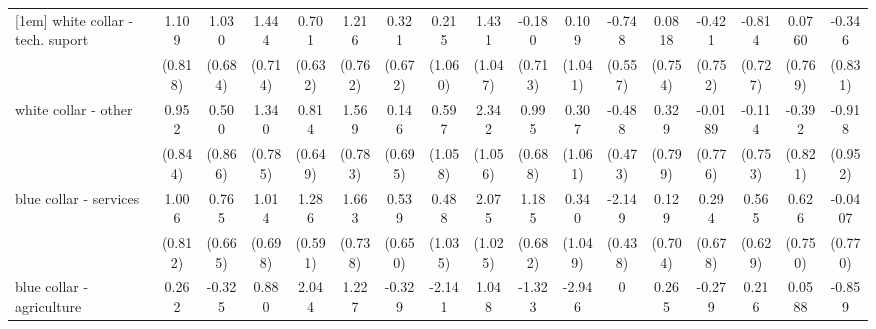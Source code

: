 {\begin{tabular}{l*{16}{c}}
[1em]
white collar - tech. suport&       1.109         &       1.030         &       1.444\sym{*}  &       0.701         &       1.216         &       0.321         &       0.215         &       1.431         &      -0.180         &       0.109         &      -0.748         &      0.0818         &      -0.421         &      -0.814         &      0.0760         &      -0.346         \\
                    &     (0.818)         &     (0.684)         &     (0.714)         &     (0.632)         &     (0.762)         &     (0.672)         &     (1.060)         &     (1.047)         &     (0.713)         &     (1.041)         &     (0.557)         &     (0.754)         &     (0.752)         &     (0.727)         &     (0.769)         &     (0.831)         \\
[1em]
white collar - other&       0.952         &       0.500         &       1.340         &       0.814         &       1.569\sym{*}  &       0.146         &       0.597         &       2.342\sym{*}  &       0.995         &       0.307         &      -0.488         &       0.329         &     -0.0189         &      -0.114         &      -0.392         &      -0.918         \\
                    &     (0.844)         &     (0.866)         &     (0.785)         &     (0.649)         &     (0.783)         &     (0.695)         &     (1.058)         &     (1.056)         &     (0.688)         &     (1.061)         &     (0.473)         &     (0.799)         &     (0.776)         &     (0.753)         &     (0.821)         &     (0.952)         \\
[1em]
blue collar - services&       1.006         &       0.765         &       1.014         &       1.286\sym{*}  &       1.663\sym{*}  &       0.539         &       0.488         &       2.075\sym{*}  &       1.185         &       0.340         &      -2.149\sym{***}&       0.129         &       0.294         &       0.565         &       0.626         &     -0.0407         \\
                    &     (0.812)         &     (0.665)         &     (0.698)         &     (0.591)         &     (0.738)         &     (0.650)         &     (1.035)         &     (1.025)         &     (0.682)         &     (1.049)         &     (0.438)         &     (0.704)         &     (0.678)         &     (0.629)         &     (0.750)         &     (0.770)         \\
[1em]
blue collar - agriculture&       0.262         &      -0.325         &       0.880         &       2.044\sym{**} &       1.227         &      -0.329         &      -2.141         &       1.048         &      -1.323         &      -2.946\sym{*}  &           0         &       0.265         &      -0.279         &       0.216         &      0.0588         &      -0.859         \\

\end{tabular}}
